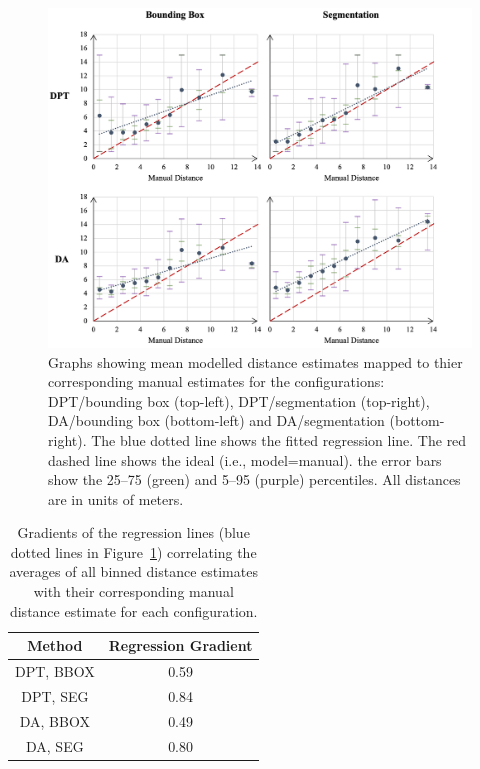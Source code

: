 \begin{figure}[H]
    \centering
    \vspace{1cm}
    \includegraphics[width=1.01\textwidth]{body/analysis/assets/distance_graphs/averages}
    \caption{Graphs showing mean modelled distance estimates mapped to thier corresponding manual
    estimates for the configurations: DPT/bounding box (top-left), DPT/segmentation (top-right),
        DA/bounding box (bottom-left) and DA/segmentation (bottom-right). The blue dotted line
        shows the fitted regression line. The red dashed line shows the ideal (i.e., model=manual).
        the error bars show the 25–75 (green) and 5–95 (purple) percentiles. All distances are in
        units of meters.}
    \label{fig:distance_comparison}
\end{figure}

\vspace{1cm}

\begin{table}[H]
    \centering
    \caption{Gradients of the regression lines (blue dotted lines in Figure~\ref{fig:distance_comparison})
        correlating the averages of all binned distance estimates with their corresponding manual distance
        estimate for each configuration.}
    \label{tab:regression_gradients}
    \begin{tabular}{cc}
        \textbf{Method} & \textbf{Regression Gradient}\\
        \midrule
        DPT, BBOX & 0.59 \\
        DPT, SEG  & 0.84 \\
        DA, BBOX  & 0.49 \\
        DA, SEG   & 0.80 \\
    \end{tabular}
\end{table}

